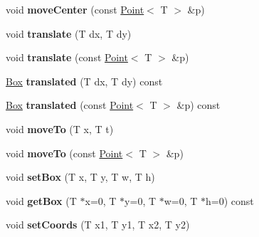 \begin{DoxyCompactItemize}
\item 
\hypertarget{class_box_a62d7d531ad38076276749bcfc20285d2}{
void {\bfseries moveCenter} (const \hyperlink{class_point}{Point}$<$ T $>$ \&p)}
\label{class_box_a62d7d531ad38076276749bcfc20285d2}

\item 
\hypertarget{class_box_a2c3adee7df1462f3bfa5ae4870148505}{
void {\bfseries translate} (T dx, T dy)}
\label{class_box_a2c3adee7df1462f3bfa5ae4870148505}

\item 
\hypertarget{class_box_a077d6debae34fe86b701d7b2f8898c80}{
void {\bfseries translate} (const \hyperlink{class_point}{Point}$<$ T $>$ \&p)}
\label{class_box_a077d6debae34fe86b701d7b2f8898c80}

\item 
\hypertarget{class_box_a435e394b453a84f5c82f4163652dfb50}{
\hyperlink{class_box}{Box} {\bfseries translated} (T dx, T dy) const }
\label{class_box_a435e394b453a84f5c82f4163652dfb50}

\item 
\hypertarget{class_box_ac441f74500a5f381dd80639c683cfe7e}{
\hyperlink{class_box}{Box} {\bfseries translated} (const \hyperlink{class_point}{Point}$<$ T $>$ \&p) const }
\label{class_box_ac441f74500a5f381dd80639c683cfe7e}

\item 
\hypertarget{class_box_a484604d7fec04732de90ea55da3b7b6a}{
void {\bfseries moveTo} (T x, T t)}
\label{class_box_a484604d7fec04732de90ea55da3b7b6a}

\item 
\hypertarget{class_box_a3c7f973d21b9144b2b1d5a854f2aec9b}{
void {\bfseries moveTo} (const \hyperlink{class_point}{Point}$<$ T $>$ \&p)}
\label{class_box_a3c7f973d21b9144b2b1d5a854f2aec9b}

\item 
\hypertarget{class_box_a58b4172de656a853e63734c8501ca2d3}{
void {\bfseries setBox} (T x, T y, T w, T h)}
\label{class_box_a58b4172de656a853e63734c8501ca2d3}

\item 
\hypertarget{class_box_a2a5767d016fc9a5960f3e2a3c9fa5c89}{
void {\bfseries getBox} (T $\ast$x=0, T $\ast$y=0, T $\ast$w=0, T $\ast$h=0) const }
\label{class_box_a2a5767d016fc9a5960f3e2a3c9fa5c89}

\item 
\hypertarget{class_box_a34c9185bc13058d287f762f70a44738b}{
void {\bfseries setCoords} (T x1, T y1, T x2, T y2)}
\label{class_box_a34c9185bc13058d287f762f70a44738b}


\end{DoxyCompactItemize}
